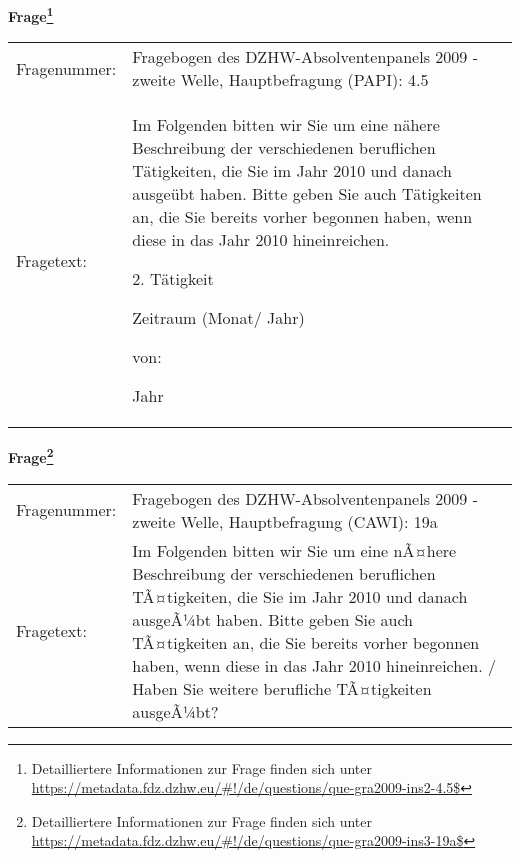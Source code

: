 				\vspace*{0.5cm}
                \noindent\textbf{Frage\footnote{Detailliertere Informationen zur Frage finden sich unter
		              \url{https://metadata.fdz.dzhw.eu/\#!/de/questions/que-gra2009-ins2-4.5$}}}\\
				\begin{tabularx}{\hsize}{@{}lX}
					Fragenummer: &
					  Fragebogen des DZHW-Absolventenpanels 2009 - zweite Welle, Hauptbefragung (PAPI):
					  4.5
 \\
					Fragetext: & Im Folgenden bitten wir Sie um eine nähere Beschreibung der verschiedenen beruflichen Tätigkeiten, die Sie im Jahr 2010 und danach ausgeübt haben. Bitte geben Sie auch Tätigkeiten an, die Sie bereits vorher begonnen haben, wenn diese in das Jahr 2010 hineinreichen.\par  2. Tätigkeit\par  Zeitraum (Monat/ Jahr)\par  von:\par  Jahr \\
				\end{tabularx}
				\vspace*{0.5cm}
                \noindent\textbf{Frage\footnote{Detailliertere Informationen zur Frage finden sich unter
		              \url{https://metadata.fdz.dzhw.eu/\#!/de/questions/que-gra2009-ins3-19a$}}}\\
				\begin{tabularx}{\hsize}{@{}lX}
					Fragenummer: &
					  Fragebogen des DZHW-Absolventenpanels 2009 - zweite Welle, Hauptbefragung (CAWI):
					  19a
 \\
					Fragetext: & Im Folgenden bitten wir Sie um eine nÃ¤here Beschreibung der verschiedenen beruflichen TÃ¤tigkeiten, die Sie im Jahr 2010 und danach ausgeÃ¼bt haben. Bitte geben Sie auch TÃ¤tigkeiten an, die Sie bereits vorher begonnen haben, wenn diese in das Jahr 2010 hineinreichen. / Haben Sie weitere berufliche TÃ¤tigkeiten ausgeÃ¼bt? \\
				\end{tabularx}





